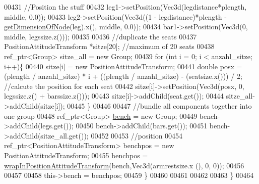 \begin{DoxyCode}
00431         \textcolor{comment}{//Position the stuff}
00432         leg1->setPosition(Vec3d(legdistance*plength, middle, 0.0));
00433         leg2->setPosition(Vec3d((1 - legdistance)*plength - \hyperlink{namespacebrtr_a24ba7c5d07ad50afb09990116dd3556d}{getDimensionOfNode}(leg).x(), 
      middle, 0.0));
00434         bar1->setPosition(Vec3d(0, middle, legssize.z()));
00435 
00436         \textcolor{comment}{//duplicate the seats}
00437         PositionAttitudeTransform *sitze[20]; \textcolor{comment}{//maximum of 20 seats}
00438         ref\_ptr<Group> sitze\_all = \textcolor{keyword}{new} Group;
00439         \textcolor{keywordflow}{for} (\textcolor{keywordtype}{int} i = 0; i < anzahl\_sitze; i++)\{
00440             sitze[i] = \textcolor{keyword}{new} PositionAttitudeTransform;
00441             \textcolor{keywordtype}{double} posx = (plength / anzahl\_sitze) * i + ((plength / anzahl\_sitze) - (seatsize.x())) / 2; \textcolor{comment}{
      //calcute the position for each seat}
00442             sitze[i]->setPosition(Vec3d(posx, 0, legssize.z() + barssize.z()));
00443             sitze[i]->addChild(seat.get());
00444             sitze\_all->addChild(sitze[i]);
00445         \}
00446 
00447         \textcolor{comment}{//bundle all components together into one group}
00448         ref\_ptr<Group> \hyperlink{classbrtr_1_1_bench_aa3da8798872d1c2d595c24a48a5cb427}{bench} = \textcolor{keyword}{new} Group;
00449         bench->addChild(legs.get());
00450         bench->addChild(bars.get());
00451         bench->addChild(sitze\_all.get());
00452         
00453         \textcolor{comment}{//position}
00454         ref\_ptr<PositionAttitudeTransform> benchpos = \textcolor{keyword}{new} PositionAttitudeTransform;
00455         benchpos = \hyperlink{namespacebrtr_a887d7975f37c4334b70e2196735b6678}{wrapInPositionAttitudeTransform}(bench,Vec3d(armrestsize.x
      (), 0, 0));
00456       
00457         
00458         this->bench = benchpos;
00459     \}
00460 
00461 
00462 
00463 \}
00464 
\end{DoxyCode}
